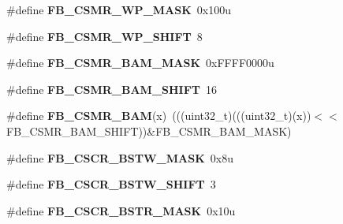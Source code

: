 \begin{DoxyCompactItemize}
\item 
\#define {\bfseries F\+B\+\_\+\+C\+S\+M\+R\+\_\+\+W\+P\+\_\+\+M\+A\+SK}~0x100u\hypertarget{group__FB__Register__Masks_ga40725292274706aa0a0c013201498f4b}{}\label{group__FB__Register__Masks_ga40725292274706aa0a0c013201498f4b}

\item 
\#define {\bfseries F\+B\+\_\+\+C\+S\+M\+R\+\_\+\+W\+P\+\_\+\+S\+H\+I\+FT}~8\hypertarget{group__FB__Register__Masks_ga6d49da1d3aabbb8619673ac0fba95dd1}{}\label{group__FB__Register__Masks_ga6d49da1d3aabbb8619673ac0fba95dd1}

\item 
\#define {\bfseries F\+B\+\_\+\+C\+S\+M\+R\+\_\+\+B\+A\+M\+\_\+\+M\+A\+SK}~0x\+F\+F\+F\+F0000u\hypertarget{group__FB__Register__Masks_ga9f7361c70716e7a39579b6418ae2c20c}{}\label{group__FB__Register__Masks_ga9f7361c70716e7a39579b6418ae2c20c}

\item 
\#define {\bfseries F\+B\+\_\+\+C\+S\+M\+R\+\_\+\+B\+A\+M\+\_\+\+S\+H\+I\+FT}~16\hypertarget{group__FB__Register__Masks_ga6a99aa1f2614f6287dfa8a83a2ceead4}{}\label{group__FB__Register__Masks_ga6a99aa1f2614f6287dfa8a83a2ceead4}

\item 
\#define {\bfseries F\+B\+\_\+\+C\+S\+M\+R\+\_\+\+B\+AM}(x)~(((uint32\+\_\+t)(((uint32\+\_\+t)(x))$<$$<$F\+B\+\_\+\+C\+S\+M\+R\+\_\+\+B\+A\+M\+\_\+\+S\+H\+I\+FT))\&F\+B\+\_\+\+C\+S\+M\+R\+\_\+\+B\+A\+M\+\_\+\+M\+A\+SK)\hypertarget{group__FB__Register__Masks_ga2ef6f66f3c2595772b2fc4e841fc834e}{}\label{group__FB__Register__Masks_ga2ef6f66f3c2595772b2fc4e841fc834e}

\item 
\#define {\bfseries F\+B\+\_\+\+C\+S\+C\+R\+\_\+\+B\+S\+T\+W\+\_\+\+M\+A\+SK}~0x8u\hypertarget{group__FB__Register__Masks_gaee04052f66392a6242d45c0598b8606a}{}\label{group__FB__Register__Masks_gaee04052f66392a6242d45c0598b8606a}

\item 
\#define {\bfseries F\+B\+\_\+\+C\+S\+C\+R\+\_\+\+B\+S\+T\+W\+\_\+\+S\+H\+I\+FT}~3\hypertarget{group__FB__Register__Masks_ga34341b855043b3fbffcad2811084fec8}{}\label{group__FB__Register__Masks_ga34341b855043b3fbffcad2811084fec8}

\item 
\#define {\bfseries F\+B\+\_\+\+C\+S\+C\+R\+\_\+\+B\+S\+T\+R\+\_\+\+M\+A\+SK}~0x10u\hypertarget{group__FB__Register__Masks_gac577e626a579979985c559866c940018}{}\label{group__FB__Register__Masks_gac577e626a579979985c559866c940018}


\end{DoxyCompactItemize}
